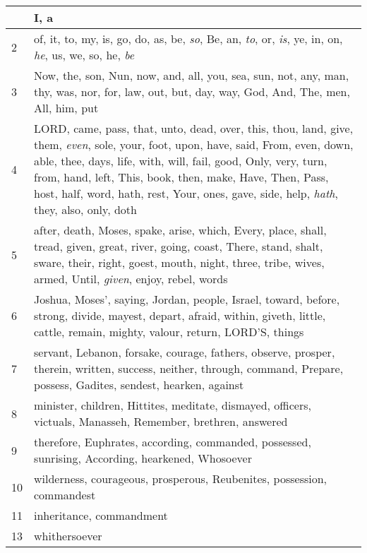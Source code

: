 \begin{longtable}{l|p{3.75in}}
\hline \hline
\endlastfoot
1 & I, a \\ \hline
2 & of, it, to, my, is, go, do, as, be, \emph{so}, Be, an, \emph{to}, or, \emph{is}, ye, in, on, \emph{he}, us, we, so, he, \emph{be} \\ \hline
3 & Now, the, son, Nun, now, and, all, you, sea, sun, not, any, man, thy, was, nor, for, law, out, but, day, way, God, And, The, men, All, him, put \\ \hline
4 & LORD, came, pass, that, unto, dead, over, this, thou, land, give, them, \emph{even}, sole, your, foot, upon, have, said, From, even, down, able, thee, days, life, with, will, fail, good, Only, very, turn, from, hand, left, This, book, then, make, Have, Then, Pass, host, half, word, hath, rest, Your, ones, gave, side, help, \emph{hath}, they, also, only, doth \\ \hline
5 & after, death, Moses, spake, arise, which, Every, place, shall, tread, given, great, river, going, coast, There, stand, shalt, sware, their, right, goest, mouth, night, three, tribe, wives, armed, Until, \emph{given}, enjoy, rebel, words \\ \hline
6 & Joshua, Moses', saying, Jordan, people, Israel, toward, before, strong, divide, mayest, depart, afraid, within, giveth, little, cattle, remain, mighty, valour, return, LORD'S, things \\ \hline
7 & servant, Lebanon, forsake, courage, fathers, observe, prosper, therein, written, success, neither, through, command, Prepare, possess, Gadites, sendest, hearken, against \\ \hline
8 & minister, children, Hittites, meditate, dismayed, officers, victuals, Manasseh, Remember, brethren, answered \\ \hline
9 & therefore, Euphrates, according, commanded, possessed, sunrising, According, hearkened, Whosoever \\ \hline
10 & wilderness, courageous, prosperous, Reubenites, possession, commandest \\ \hline
11 & inheritance, commandment \\ \hline
13 & whithersoever \\ \hline
\end{longtable}






 



